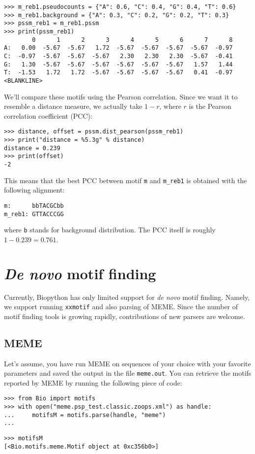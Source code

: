 \begin{verbatim}
>>> m_reb1.pseudocounts = {"A": 0.6, "C": 0.4, "G": 0.4, "T": 0.6}
>>> m_reb1.background = {"A": 0.3, "C": 0.2, "G": 0.2, "T": 0.3}
>>> pssm_reb1 = m_reb1.pssm
>>> print(pssm_reb1)
        0      1      2      3      4      5      6      7      8
A:   0.00  -5.67  -5.67   1.72  -5.67  -5.67  -5.67  -5.67  -0.97
C:  -0.97  -5.67  -5.67  -5.67   2.30   2.30   2.30  -5.67  -0.41
G:   1.30  -5.67  -5.67  -5.67  -5.67  -5.67  -5.67   1.57   1.44
T:  -1.53   1.72   1.72  -5.67  -5.67  -5.67  -5.67   0.41  -0.97
<BLANKLINE>
\end{verbatim}
We'll compare these motifs using the Pearson correlation.
Since we want it to resemble a distance measure, we actually take
$1-r$, where $r$ is the Pearson correlation coefficient (PCC):

\begin{verbatim}
>>> distance, offset = pssm.dist_pearson(pssm_reb1)
>>> print("distance = %5.3g" % distance)
distance = 0.239
>>> print(offset)
-2
\end{verbatim}
This means that the best PCC between motif \verb|m| and  \verb|m_reb1| is obtained with the following alignment:
\begin{verbatim}
m:      bbTACGCbb
m_reb1: GTTACCCGG
\end{verbatim}
where \verb|b| stands for background distribution. The PCC itself is
roughly $1-0.239=0.761$.

\section{\emph{De novo} motif finding}
\label{sec:find}

Currently, Biopython has only limited support for \emph{de novo} motif
finding. Namely, we support running \verb|xxmotif| and also parsing of
MEME. Since the number of motif finding tools is growing rapidly,
contributions of new parsers are welcome.

\subsection{MEME}
\label{sec:meme}

Let's assume, you have run MEME on sequences of your choice with your
favorite parameters and saved the output in the file
\verb|meme.out|. You can retrieve the motifs reported by MEME by
running the following piece of code:

\begin{verbatim}
>>> from Bio import motifs
>>> with open("meme.psp_test.classic.zoops.xml") as handle:
...     motifsM = motifs.parse(handle, "meme")
...
\end{verbatim}
\begin{verbatim}
>>> motifsM
[<Bio.motifs.meme.Motif object at 0xc356b0>]
\end{verbatim}

